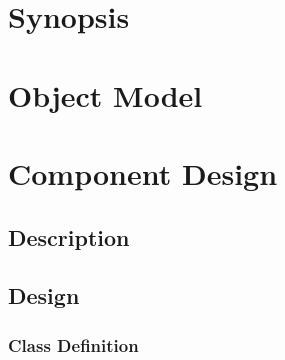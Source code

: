 \documentclass[]{article}
\begin{document}




\newpage
\tableofcontents

\newpage


\section{Synopsis}





%


\section{Object Model}




%
%

\section{Component Design}

\subsection{Description}




\subsection{Design}




\subsubsection{Class Definition}
\end{document}
